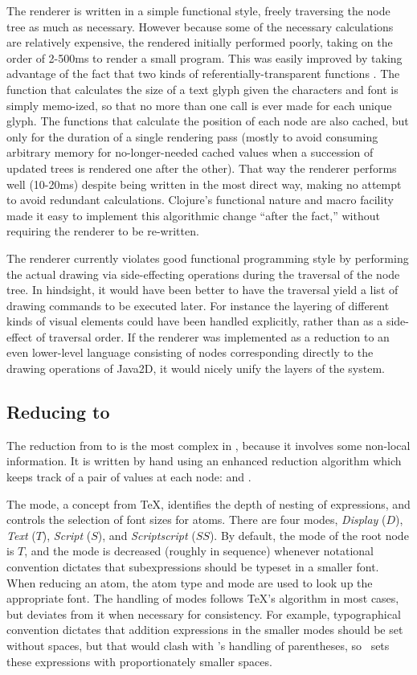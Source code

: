 The renderer is written in a simple functional style, freely traversing the node tree as much as necessary. However because some of the necessary calculations are relatively expensive, the rendered initially performed poorly, taking on the order of 2-500ms to render a small program. This was easily improved by taking advantage of the fact that two kinds of referentially-transparent functions . The function that calculates the size of a text glyph given the characters and font is simply memo-ized, so that no more than one call is ever made for each unique glyph. The functions that calculate the position of each node are also cached, but only for the duration of a single rendering pass (mostly to avoid consuming arbitrary memory for no-longer-needed cached values when a succession of updated trees is rendered one after the other). That way the renderer performs well (10-20ms) despite being written in the most direct way, making no attempt to avoid redundant calculations. Clojure's functional nature and macro facility made it easy to implement this algorithmic change ``after the fact,'' without requiring the renderer to be re-written.

The renderer currently violates good functional programming style by performing the actual drawing via side-effecting operations during the traversal of the node tree. In hindsight, it would have been better to have the traversal yield a list of drawing commands to be executed later. For instance the layering of different kinds of visual elements could have been handled explicitly, rather than as a side-effect of traversal order. If the renderer was implemented as a reduction to an even lower-level language consisting of nodes corresponding directly to the drawing operations of Java2D, it would nicely unify the layers of the system.


\subsection{Reducing  to }
The reduction from  to  is the most complex in \Meta, because it involves some non-local information. It is written by hand using an enhanced reduction algorithm which keeps track of a pair of values at each node:  and .

The mode, a concept from \TeX, identifies the depth of nesting of expressions, and controls the selection of font sizes for atoms. There are four modes, \textit{Display} ($D$), \textit{Text} ($T$), \textit{Script} ($S$), and \textit{Scriptscript} ($SS$). By default, the mode of the root node is $T$, and the mode is decreased (roughly in sequence) whenever notational convention dictates that subexpressions should be typeset in a smaller font. When reducing an atom, the atom type and mode are used to look up the appropriate font. The handling of modes follows \TeX's algorithm in most cases, but deviates from it when necessary for consistency. For example, typographical convention dictates that addition expressions in the smaller modes should be set without spaces, but that would clash with \Meta's handling of parentheses, so \Meta\ sets these expressions with proportionately smaller spaces.

